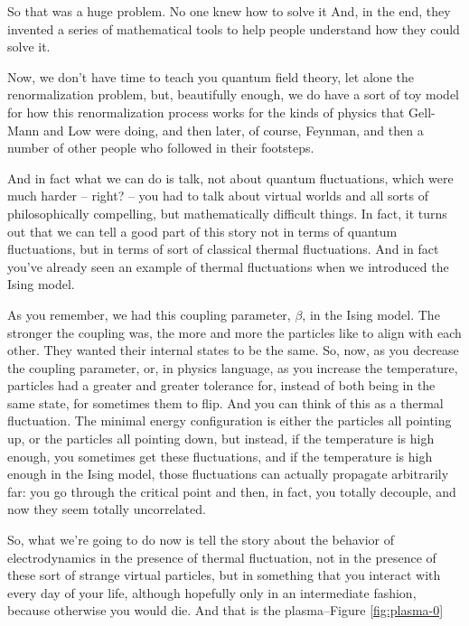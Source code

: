 \documentclass[]{article}
\begin{document}
So that was a huge problem.
No one knew how to solve it 
And, in the end, they invented
a series of mathematical tools
to help people understand
how they could solve it.

Now, we don't have time to teach you
quantum field theory,
let alone the renormalization problem,
but, beautifully enough,
we do have a sort of toy model
for how this renormalization process works
for the kinds of physics
that Gell-Mann and Low were doing,
and then later, of course, Feynman,
and then a number of other people
who followed in their footsteps.

And in fact what we can do is talk,
not about quantum fluctuations,
which were much harder – right? –
you had to talk about virtual worlds
and all sorts
of philosophically compelling,
but mathematically difficult things.
In fact, it turns out that we can tell
a good part of this story
not in terms of quantum fluctuations,
but in terms of sort of
classical thermal fluctuations.
And in fact you've already seen
an example of thermal fluctuations
when we introduced the Ising model.

As you remember, we had this coupling
parameter, $\beta$, in the Ising model.
The stronger the coupling was,
the more and more the particles
like to align with each other.
They wanted their internal states
to be the same.
So, now, as you decrease
the coupling parameter,
or, in physics language,
as you increase the temperature,
particles had a greater
and greater tolerance
for, instead of both being
in the same state,
for sometimes them to flip.
And you can think of this
as a thermal fluctuation.
The minimal energy configuration is either the particles all pointing up,
or the particles all pointing down,
but instead, if the temperature
is high enough,
you sometimes get these fluctuations,
and if the temperature
is high enough in the Ising model,
those fluctuations can actually
propagate arbitrarily far:
you go through the critical point
and then, in fact, you totally decouple,
and now they seem
totally uncorrelated.

So, what we're going to do now
is tell the story
about the behavior of electrodynamics
in the presence of thermal fluctuation,
not in the presence of these sort of
strange virtual particles,
but in something that you interact with
every day of your life,
although hopefully
only in an intermediate fashion,
because otherwise you would die.
And that is the plasma--Figure \ref{fig:plasma-0}
\end{document}
